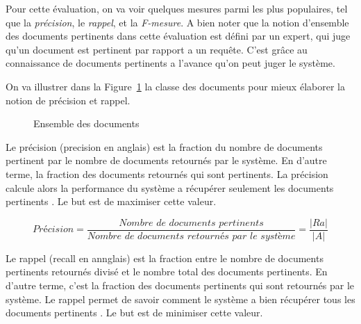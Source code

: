 Pour cette évaluation, on va voir quelques mesures parmi les plus populaires, tel que la \textit{précision}, le \textit{rappel}, et la \textit{F-mesure}. A bien noter que la notion d'ensemble des documents pertinents dans cette évaluation est défini par un expert, qui juge qu'un document est pertinent par rapport a un requête. C'est grâce au connaissance de documents pertinents a l'avance qu'on peut juger le système.

On va illustrer dans la Figure~\ref{fig:precision-recall} la classe des documents pour mieux élaborer la notion de précision et rappel.
\begin{figure}[htbp]
	\begin{center}
	\end{center}
	\caption{Ensemble des documents \citep{modern-ir}}
	\label{fig:precision-recall}
\end{figure}

Le précision (precision en anglais) est la fraction du nombre de documents pertinent par le nombre de documents retournés par le système. En d'autre terme, la fraction des documents retournés qui sont pertinents. La précision calcule alors la performance du système a récupérer seulement les documents pertinents \citep*{evaluation-of-ir-system, ir-on-web,vsm-for-arabic-language}. Le but est de maximiser cette valeur.

\[
	Précision = \frac{\textit{Nombre de documents pertinents}}{\textit{Nombre de documents retournés par le système}} = \frac{|Ra|}{|A|}
\]

Le rappel (recall en annglais) est la fraction entre le nombre de documents pertinents retournés divisé et le nombre total des documents pertinents. En d'autre terme, c'est la fraction des documents pertinents qui sont retournés par le système. Le rappel permet de savoir comment le système a bien récupérer tous les documents pertinents \citep*{evaluation-of-ir-system, ir-on-web,vsm-for-arabic-language}. Le but est de minimiser cette valeur.

